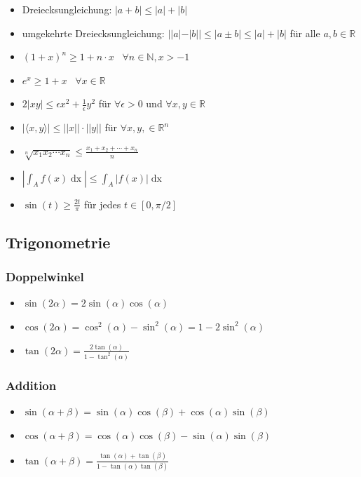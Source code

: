 \documentclass[a4paper,10pt]{article}
\def\R{\mathbb{R}}
\begin{document}
\begin{itemize}
  \item Dreiecksungleichung: $|a + b| \leq |a| + |b|$
  \item umgekehrte Dreiecksungleichung: $||a| - |b|| \leq |a \pm b| \leq |a| + |b|$ für alle $a,b \in \R$
  \item $(1+x)^n \geq 1+ n\cdot x$ \, $\forall n\in \mathbb{N}, x > -1$
  \item $e^x \geq 1 + x$ \, $\forall x\in \mathbb{R}$
  \item $2|xy| \leq \epsilon x^2 + \frac{1}{\epsilon} y^2$ für $\forall \epsilon > 0$ und $\forall x,y \in \mathbb{R}$
  \item $|\langle x,y \rangle| \leq ||x|| \cdot ||y||$ für $\forall x,y, \in \mathbb{R}^n$
  \item $\sqrt[n]{x_1 x_2 \cdots x_n} \leq \frac{x_1 + x_2 + \cdots + x_n}{n}$
  \item $\left| \int_A f(x) \mathop{dx}\right| \le \int_A \left|f(x)\right| \mathop{dx}$
  \item $\sin(t) \geq \frac{2t}{\pi}$ für jedes $t \in [0, \pi/2]$
\end{itemize}

\subsection{Trigonometrie}

\subsubsection{Doppelwinkel}
\begin{itemize}
 \item $\sin(2\alpha) = 2 \sin(\alpha) \cos(\alpha)$
 \item $\cos(2\alpha) = \cos^2(\alpha) - \sin^2(\alpha) = 1 - 2 \sin^2(\alpha)$
 \item $\tan(2\alpha) = \frac{2\tan(\alpha)}{1 - \tan^2(\alpha)}$
\end{itemize}

\subsubsection{Addition}
\begin{itemize}
 \item $\sin(\alpha + \beta) = \sin(\alpha) \cos(\beta) + \cos(\alpha) \sin(\beta)$
 \item $\cos(\alpha + \beta) = \cos(\alpha) \cos(\beta) - \sin(\alpha) \sin(\beta)$
 \item $\tan(\alpha + \beta) = \frac{\tan(\alpha) + \tan(\beta)}{1 - \tan(\alpha) \tan(\beta)}$
\end{itemize}
\end{document}
